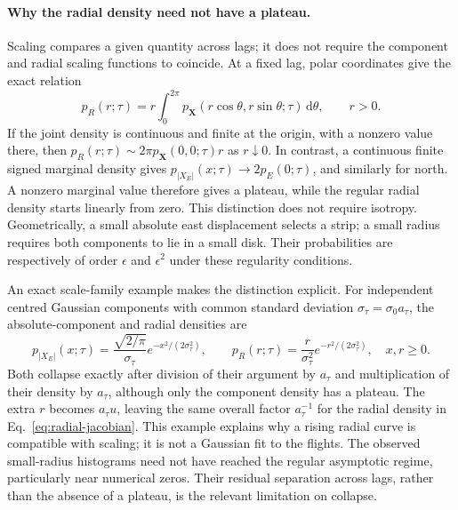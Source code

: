 \paragraph{Why the radial density need not have a plateau.}
Scaling compares a given quantity across lags; it does not require the
component and radial scaling functions to coincide. At a fixed lag, polar
coordinates give the exact relation
\begin{equation}
 p_R(r;\tau)=r\int_0^{2\pi}
 p_{\mathbf X}(r\cos\theta,r\sin\theta;\tau)\,\mathrm d\theta,
 \qquad r>0.
 \label{eq:radial-angular-density}
\end{equation}
If the joint density is continuous and finite at the origin, with a nonzero
value there, then $p_R(r;\tau)\sim2\pi p_{\mathbf X}(0,0;\tau)r$ as
$r\downarrow0$. In contrast, a continuous finite signed marginal density
gives $p_{|X_E|}(x;\tau)\to2p_E(0;\tau)$, and similarly for north.
A nonzero marginal value therefore gives a plateau, while the regular radial
density starts linearly from zero. This distinction does not require isotropy.
Geometrically, a small absolute east displacement selects a strip; a small
radius requires both components to lie in a small disk. Their probabilities
are respectively of order $\epsilon$ and $\epsilon^2$ under these regularity
conditions.

An exact scale-family example makes the distinction explicit. For independent
centred Gaussian components with common standard deviation
$\sigma_\tau=\sigma_0a_\tau$, the absolute-component and radial densities are
\begin{equation}
 p_{|X_E|}(x;\tau)=\frac{\sqrt{2/\pi}}{\sigma_\tau}
       e^{-x^2/(2\sigma_\tau^2)},\qquad
 p_R(r;\tau)=\frac{r}{\sigma_\tau^2}
       e^{-r^2/(2\sigma_\tau^2)},\quad x,r\ge0.
 \label{eq:gaussian-component-radial-scaling}
\end{equation}
Both collapse exactly after division of their argument by $a_\tau$ and
multiplication of their density by $a_\tau$, although only the component
density has a plateau. The extra $r$ becomes $a_\tau u$, leaving the same
overall factor $a_\tau^{-1}$ for the radial density in
Eq.~\eqref{eq:radial-jacobian}. This example explains why a rising radial
curve is compatible with scaling; it is not a Gaussian fit to the flights.
The observed small-radius histograms need not have reached the regular
asymptotic regime, particularly near numerical zeros. Their residual
separation across lags, rather than the absence of a plateau, is the
relevant limitation on collapse.

